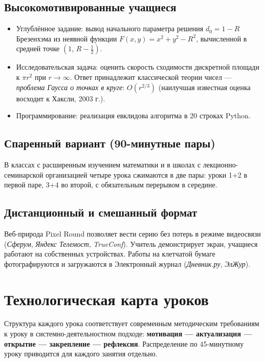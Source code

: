 \documentclass[12pt,a4paper]{scrartcl}
\newcommand{\acc}[1]{\textcolor{accent}{\textbf{#1}}}
\begin{document}
\subsection{Высокомотивированные учащиеся}
\begin{itemize}[leftmargin=1.3em,itemsep=0.15em,topsep=0.3em]
  \item Углублённое задание: вывод начального параметра решения $d_0 = 1 - R$ Брезенхэма из неявной функции $F(x, y) = x^2 + y^2 - R^2$, вычисленной в средней точке $(1,\, R - \tfrac{1}{2})$.
  \item Исследовательская задача: оценить скорость сходимости дискретной площади к $\pi r^2$ при $r \to \infty$. Ответ принадлежит классической теории чисел --- \emph{проблема Гаусса о точках в круге}: $O(r^{2/3})$ (наилучшая известная оценка восходит к Хаксли, 2003 г.).
  \item Программирование: реализация евклидова алгоритма в 20 строках Python.
\end{itemize}

\subsection{Спаренный вариант (90-минутные пары)}
В классах с расширенным изучением математики и в школах с лекционно-семинарской организацией четыре урока сжимаются в две пары: уроки 1+2 в первой паре, 3+4 во второй, с обязательным перерывом в середине.

\subsection{Дистанционный и смешанный формат}
Веб-природа Pixel Round позволяет вести серию без потерь в режиме видеосвязи (\emph{Сферум}, \emph{Яндекс Телемост}, \emph{TrueConf}). Учитель демонстрирует экран, учащиеся работают на собственных устройствах. Работы на клетчатой бумаге фотографируются и загружаются в Электронный журнал (\emph{Дневник.ру}, \emph{ЭлЖур}).

\section{Технологическая карта уроков}

Структура каждого урока соответствует современным методическим требованиям к уроку в системно-деятельностном подходе: \acc{мотивация --- актуализация --- открытие --- закрепление --- рефлексия}. Распределение по 45-минутному уроку приводится для каждого занятия отдельно.
\end{document}
